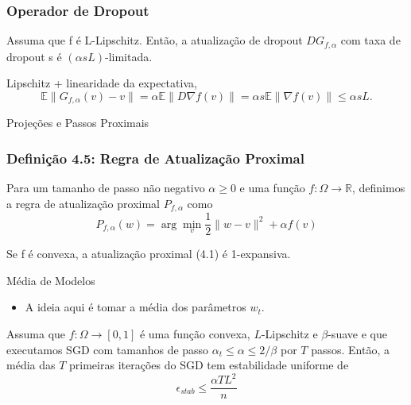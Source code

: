 \documentclass{beamer}
\newcommand{\EE}{\mathbb{E}}
\begin{document}
\begin{frame}
\frametitle{Operador de Dropout}
\begin{lemma}[4.4]
Assuma que f é L-Lipschitz. Então, a atualização de dropout \(DG_{f,\alpha}\) com taxa de dropout s é \((\alpha s L)\)-limitada. 
\end{lemma}  
Lipschitz + linearidade da expectativa,
$$ \EE\|G_{f,\alpha}(v) - v\| = \alpha\EE\|D\nabla f(v)\| = \alpha s\EE\|\nabla f(v)\| \le \alpha s L. $$  
\end{frame}

\begin{frame}{Projeções e Passos Proximais}
    
\end{frame}

\begin{frame}
\frametitle{Definição 4.5: Regra de Atualização Proximal}
\begin{definition}[4.5]
Para um tamanho de passo não negativo \(\alpha \ge 0\) e uma função \(f:\Omega \rightarrow \mathbb{R}\), definimos a regra de atualização proximal \(P_{f,\alpha}\) como
\begin{equation*}
    P_{f,\alpha}(w) = \arg\min_{v} \frac{1}{2}\|w-v\|^2 + \alpha f(v)\tag{4.1}
\end{equation*} 
\end{definition}

 
\begin{lemma}[4.6]
Se f é convexa, a atualização proximal (4.1) é 1-expansiva. 
\end{lemma}
\end{frame}
 


\begin{frame}{Média de Modelos}
    \begin{itemize}
        \item A ideia aqui é tomar a média dos parâmetros $w_t$.
    \end{itemize}
\begin{theorem}[4.7]
Assuma que \(f:\Omega \rightarrow [0,1]\) é uma função convexa, $L$-Lipschitz e \(\beta\)-suave e que executamos SGD com tamanhos de passo \(\alpha_t \le \alpha \le 2/\beta\) por $T$ passos. Então, a média das $T$ primeiras iterações do SGD tem estabilidade uniforme de
$$ \epsilon_{stab} \le \frac{\alpha T L^2}{n} $$
\end{theorem}
\end{frame}
\end{document}
